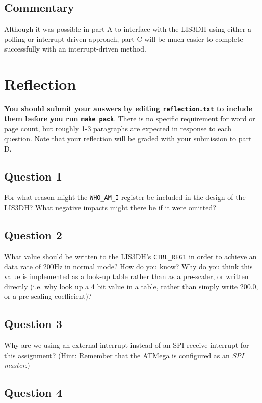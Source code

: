 \documentclass{article}
\begin{document}
\subsection{Commentary}

Although it was possible in part A to interface with the LIS3DH using either a
polling or interrupt driven approach, part C will be much easier to complete
successfully with an interrupt-driven method.

\section{Reflection}

\textbf{You should submit your answers by editing \texttt{reflection.txt} to
include them before you run \texttt{make pack}}.  There is no specific
requirement for word or page count, but roughly 1-3 paragraphs are expected in
response to each question. Note that your reflection will be graded with your
submission to part D.


\subsection{Question 1}

For what reason might the \texttt{WHO\_AM\_I} register be included in the design
of the LIS3DH? What negative impacts might there be if it were omitted?

\subsection{Question 2}

What value should be written to the LIS3DH's \texttt{CTRL\_REG1} in order to
achieve an data rate of 200Hz in normal mode? How do you know? Why do you think
this value is implemented as a look-up table rather than as a pre-scaler, or
written directly (i.e. why look up a 4 bit value in a table, rather than simply
write 200.0, or a pre-scaling coefficient)?

\subsection{Question 3}

Why are we using an external interrupt instead of an SPI receive interrupt for
this assignment? (Hint: Remember that the ATMega is configured as an
\textit{SPI master}.)

\subsection{Question 4}
\end{document}
